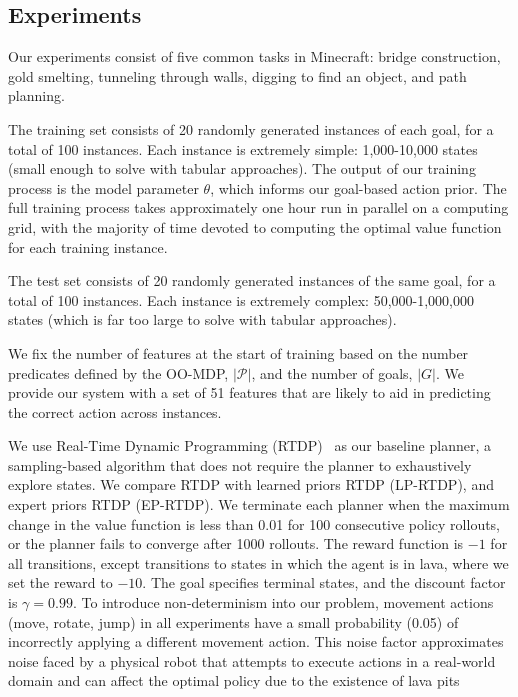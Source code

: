 \documentclass[11pt]{article}
\begin{document}
\subsection{Experiments}

Our experiments consist of five common tasks in Minecraft:
bridge construction, gold smelting, tunneling through
walls, digging to find an object, and path planning.

The training set consists of 20 randomly generated instances of each goal, for a total of 100 instances. Each instance is extremely simple: 1,000-10,000 states (small enough to solve with tabular approaches). The output of our training process is the model parameter $\theta$, which informs our goal-based action prior. The full training process takes approximately one hour run in parallel on a computing grid, with the majority of time devoted to computing the optimal value function for each training instance.

The test set consists of 20 randomly generated instances of the same goal, for a total of 100 instances. Each instance is extremely complex: 50,000-1,000,000 states (which is far too large to solve with tabular approaches).

We fix the number of features at the start of training based on the number
predicates defined by the OO-MDP, $|\mathcal{P}|$, and the number of goals, $|G|$.
We provide our system with a set of 51 features that are likely to aid in predicting the correct action across instances.

We use Real-Time Dynamic Programming (RTDP)~\cite{barto95} as our
baseline planner, a sampling-based algorithm that does not require the
planner to exhaustively explore states. We compare RTDP with learned
priors RTDP (LP-RTDP), and expert priors RTDP (EP-RTDP).
We terminate each planner when the maximum change in
the value function is less than 0.01 for 100 consecutive policy
rollouts, or the planner fails to converge after 1000 rollouts.  The
reward function is $-1$ for all transitions, except transitions to
states in which the agent is in lava, where we set the reward to
$-10$. The goal specifies terminal states, and the discount factor is
$\gamma = 0.99$.  To introduce non-determinism into our problem,
movement actions (move, rotate, jump) in all experiments have a small
probability (0.05) of incorrectly applying a different movement
action.  This noise factor approximates noise faced by a physical
robot that attempts to execute actions in a real-world domain and
can affect the optimal policy due to the existence of lava pits
\end{document}
